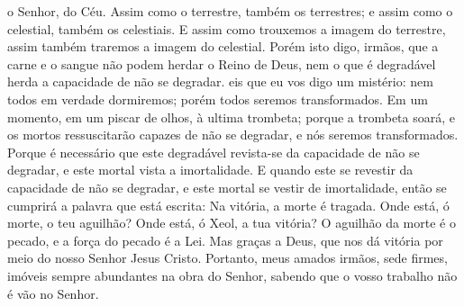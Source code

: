 {{} o Senhor,
{} do Céu.
  Assim como
{} o terrestre, também
{} os terrestres; e assim como
{} o celestial, também
{} os celestiais.
  E assim como trouxemos a imagem do terrestre, assim também traremos a imagem do celestial.
  Porém isto digo, irmãos, que a carne e o sangue não podem herdar o Reino de Deus, nem o que é degradável herda a capacidade de não se degradar.
  eis que eu vos digo um mistério: nem todos em verdade dormiremos; porém todos seremos transformados.
  Em um momento, em um piscar de olhos, à ultima trombeta; porque a trombeta soará, e os mortos ressuscitarão capazes de não se degradar, e nós seremos transformados.
  Porque é necessário que este
{} degradável revista-se da capacidade de não se degradar, e este
{} mortal vista a imortalidade.
  E quando este
{} se revestir da capacidade de não se degradar, e este
{} mortal se vestir de imortalidade, então se cumprirá a palavra que está escrita: Na vitória, a morte é tragada.
  Onde está, ó morte, o teu aguilhão? Onde está, ó Xeol,
 a tua vitória?
  O aguilhão da morte é o pecado, e a força do pecado é a Lei.
  Mas graças a Deus, que nos dá vitória por meio do nosso Senhor Jesus Cristo.
  Portanto, meus amados irmãos, sede firmes, imóveis
{} sempre abundantes na obra do Senhor, sabendo que o vosso trabalho não é vão no Senhor.
\par }

